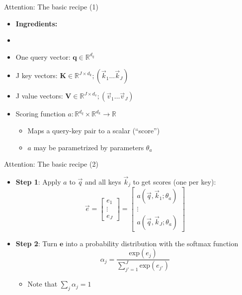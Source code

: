 
\begin{vbframe}{Attention: The basic recipe (1)}

\vfill

\begin{itemize}
	\item \textbf{Ingredients:}
	\item[]
	\item One query vector: $\mathbf{q} \in \mathbb{R}^{d_q}$
	\item J key vectors: $\mathbf{K} \in \mathbb{R}^{J \times d_k}; (\vec k_1 \ldots \vec k_J)$
	\item J value vectors: $\mathbf{V} \in \mathbb{R}^{J \times d_v}; (\vec v_1 \ldots \vec v_J)$
	\item Scoring function $a : \mathbb{R}^{d_q} \times \mathbb{R}^{d_k} \rightarrow \mathbb{R}$
		\begin{itemize}
			\item Maps a query-key pair to a scalar (``score'')
			\item $a$ may be parametrized by parameters $\theta_a$
		\end{itemize}
\end{itemize}

\vfill

\end{vbframe}


\begin{vbframe}{Attention: The basic recipe (2)}

\vfill

\begin{itemize}
	\item \textbf{Step 1}: Apply $a$ to $\vec q$ and all keys $\vec k_j$ to get scores (one per key): 
	$$\vec e = \begin{bmatrix} e_1 \\ \vdots \\ e_J \end{bmatrix} =  \begin{bmatrix} a(\vec q, \vec k_1; \theta_a) \\ \vdots \\ a(\vec q, \vec k_J; \theta_a) \end{bmatrix}$$
	\item \textbf{Step 2}: Turn $\mathbf{e}$ into a probability distribution with the softmax function
	$$\alpha_j = \frac{\mathrm{exp}(e_j)}{\sum_{j'=1}^J \mathrm{exp}(e_{j'})}$$
		\begin{itemize}
			\item Note that $\sum_j \alpha_j = 1$
		\end{itemize}
\end{itemize}

\vfill

\end{vbframe}

